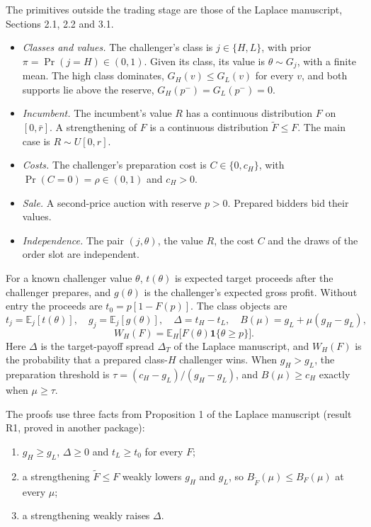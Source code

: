 \documentclass[11pt]{article}
\theoremstyle{definition}
\newcommand{\E}{\mathbb E}
\newcommand{\one}{\mathbf 1}
\begin{document}
The primitives outside the trading stage are those of the Laplace manuscript, Sections 2.1, 2.2 and 3.1.
\begin{itemize}
\item \emph{Classes and values.} The challenger's class is $j\in\{H,L\}$, with prior $\pi=\Pr(j=H)\in(0,1)$.
  Given its class, its value is $\theta\sim G_j$, with a finite mean. The high class dominates,
  $G_H(v)\le G_L(v)$ for every $v$, and both supports lie above the reserve, $G_H(p^-)=G_L(p^-)=0$.
\item \emph{Incumbent.} The incumbent's value $R$ has a continuous distribution $F$ on $[0,\bar r]$.
  A strengthening of $F$ is a continuous distribution $\tilde F\le F$. The main case is $R\sim U[0,r]$.
\item \emph{Costs.} The challenger's preparation cost is $C\in\{0,c_H\}$, with $\Pr(C=0)=\rho\in(0,1)$ and $c_H>0$.
\item \emph{Sale.} A second-price auction with reserve $p>0$. Prepared bidders bid their values.
\item \emph{Independence.} The pair $(j,\theta)$, the value $R$, the cost $C$ and the draws of the order slot
  are independent.
\end{itemize}

For a known challenger value $\theta$, $t(\theta)$ is expected target proceeds after the challenger prepares,
and $g(\theta)$ is the challenger's expected gross profit. Without entry the proceeds are $t_0=p[1-F(p)]$.
The class objects are
\[
t_j=\E_j[t(\theta)],\quad g_j=\E_j[g(\theta)],\quad \Delta=t_H-t_L,\quad B(\mu)=g_L+\mu(g_H-g_L),
\]
\[
W_H(F)=\E_H\big[F(\theta)\one\{\theta\ge p\}\big].
\]
Here $\Delta$ is the target-payoff spread $\Delta_T$ of the Laplace manuscript, and $W_H(F)$ is the
probability that a prepared class-$H$ challenger wins. When $g_H>g_L$, the preparation threshold is
$\tau=(c_H-g_L)/(g_H-g_L)$, and $B(\mu)\ge c_H$ exactly when $\mu\ge\tau$.

The proofs use three facts from Proposition 1 of the Laplace manuscript (result R1, proved in another package):
\begin{enumerate}[label=(P\arabic*)]
\item $g_H\ge g_L$, $\Delta\ge 0$ and $t_L\ge t_0$ for every $F$;
\item a strengthening $\tilde F\le F$ weakly lowers $g_H$ and $g_L$, so $B_{\tilde F}(\mu)\le B_F(\mu)$ at every $\mu$;
\item a strengthening weakly raises $\Delta$.
\end{enumerate}
\end{document}
